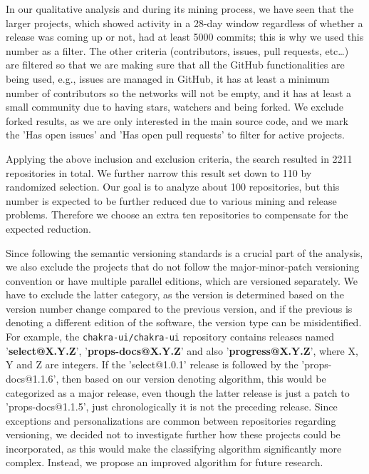 In our qualitative analysis and during its mining process, we have seen that the larger projects, which showed activity in a 28-day window regardless of whether a release was coming up or not, had at least 5000 commits; this is why we used this number as a filter. The other criteria (contributors, issues, pull requests, etc\dots) are filtered so that we are making sure that all the GitHub functionalities are being used, e.g., issues are managed in GitHub, it has at least a minimum number of contributors so the networks will not be empty, and it has at least a small community due to having stars, watchers and being forked. We exclude forked results, as we are only interested in the main source code, and we mark the 'Has open issues' and 'Has open pull requests' to filter for active projects.

Applying the above inclusion and exclusion criteria, the search resulted in 2211 repositories in total. We further narrow this result set down to 110 by randomized selection. Our goal is to analyze about 100 repositories, but this number is expected to be further reduced due to various mining and release problems. Therefore we choose an extra ten repositories to compensate for the expected reduction.

Since following the semantic versioning standards is a crucial part of the analysis, we also exclude the projects that do not follow the major-minor-patch versioning convention or have multiple parallel editions, which are versioned separately. We have to exclude the latter category, as the version is determined based on the version number change compared to the previous version, and if the previous is denoting a different edition of the software, the version type can be misidentified. For example, the \texttt{chakra-ui/chakra-ui} repository contains releases named '\textbf{select@X.Y.Z}', '\textbf{props-docs@X.Y.Z}' and also '\textbf{progress@X.Y.Z}', where X, Y and Z are integers. If the 'select@1.0.1' release is followed by the 'props-docs@1.1.6', then based on our version denoting algorithm, this would be categorized as a major release, even though the latter release is just a patch to 'props-docs@1.1.5', just chronologically it is not the preceding release. Since exceptions and personalizations are common between repositories regarding versioning, we decided not to investigate further how these projects could be incorporated, as this would make the classifying algorithm significantly more complex. Instead, we propose an improved algorithm for future research.


